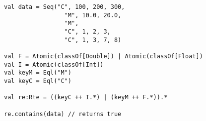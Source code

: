 \begin{lstlisting}[style=scalaioScala]
val data = Seq("C", 100, 200, 300,
                 "M", 10.0, 20.0,
                 "M",
                 "C", 1, 2, 3,
                 "C", 1, 3, 7, 8)

val F = Atomic(classOf[Double]) | Atomic(classOf[Float])
val I = Atomic(classOf[Int])
val keyM = Eql("M")
val keyC = Eql("C")

val re:Rte = ((keyC ++ I.*) | (keyM ++ F.*)).*

re.contains(data) // returns true
\end{lstlisting}
